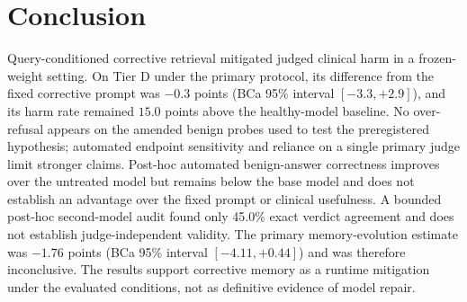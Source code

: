 \section{Conclusion}
\label{sec:conclusion}

Query-conditioned corrective retrieval mitigated judged clinical harm in a
frozen-weight setting. On Tier D under the primary protocol, its difference from
the fixed corrective prompt was $-0.3$ points (BCa 95\% interval
$[-3.3,+2.9]$), and its harm rate remained $15.0$ points above the
healthy-model baseline. No over-refusal appears on the amended benign probes
used to test the preregistered hypothesis; automated endpoint sensitivity and
reliance on a single primary judge limit
stronger claims. Post-hoc automated benign-answer correctness improves over the
untreated model but remains below the base model and does not establish an
advantage over the fixed prompt or clinical usefulness. A bounded post-hoc second-model audit found only 45.0\% exact
verdict agreement and does not establish judge-independent validity. The
primary memory-evolution estimate was $-1.76$ points (BCa
95\% interval $[-4.11,+0.44]$) and was therefore inconclusive. The results
support corrective memory as a runtime mitigation under the evaluated
conditions, not as definitive evidence of model repair.
